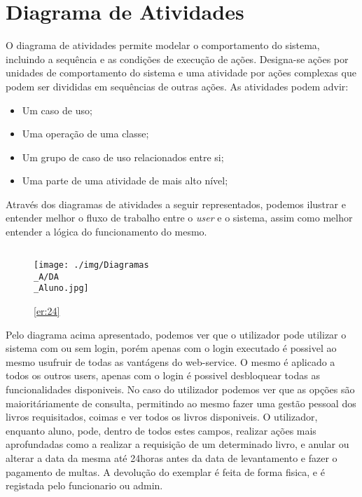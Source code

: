 \section{Diagrama de Atividades}

O diagrama de atividades permite modelar o comportamento do sistema, incluindo a sequência e as condições de execução de ações. Designa-se ações por unidades de comportamento do sistema e uma atividade por ações complexas que podem ser divididas em sequências de outras ações. As atividades podem advir:

\begin{itemize}
	\item Um caso de uso;
	\item Uma operação de uma classe;
	\item Um grupo de caso de uso relacionados entre si;
	\item Uma parte de uma atividade de mais alto nível;
\end{itemize}

\par Através dos diagramas de atividades a seguir representados, podemos ilustrar e entender melhor o fluxo de trabalho entre o \textit{user} e o sistema, assim como melhor entender a lógica do funcionamento do mesmo.

\newpage

\subsection{}

\begin{figure}[H]
	\centering
	\texttt{[image: ./img/Diagramas\\\_A/DA\\\_Aluno.jpg]}  %
	\caption{\ref{er:24}}
	\label{fig:chap240}
\end{figure}

Pelo diagrama acima apresentado, podemos ver que o utilizador pode utilizar o sistema com ou sem login, porém apenas com o login executado é possivel ao mesmo usufruir de todas as vantágens do web-service. O mesmo é aplicado a todos os outros users, apenas com o login é possivel desbloquear todas as funcionalidades disponiveis.
No caso do utilizador podemos ver que as opções são maioritáriamente de consulta, permitindo ao mesmo fazer uma gestão pessoal dos livros requisitados, coimas e ver todos os livros disponiveis.
O utilizador, enquanto aluno, pode, dentro de todos estes campos, realizar ações mais aprofundadas como a realizar a requisição de um determinado livro, e anular ou alterar a data da mesma até 24horas antes da data de levantamento e fazer o pagamento de multas.
A devolução do exemplar é feita de forma fisica, e é registada pelo funcionario ou admin.

\newpage


\newpage


\newpage


